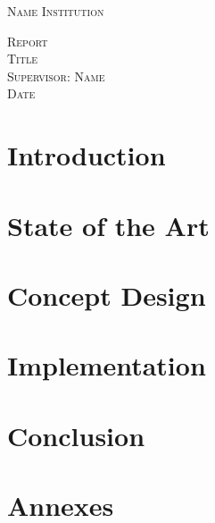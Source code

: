 \documentclass[a4paper, 11pt]{article}
\begin{document}
\begin{titlepage}
	\textsc{\Large Name \hfill Institution}\\[0.5cm]
  \begin{center}
    \textsc{\Large Report}\\[2cm]
	\textsc{\Huge Title}\\[1cm]
    \textsc{\Large Supervisor: Name}\\[1.0cm]
    \textsc{\Large Date}\\

\end{center}

\end{titlepage}

\clearpage
\tableofcontents
\clearpage

\section{Introduction}
%
\clearpage

\section{State of the Art}
%
\clearpage

\section{Concept Design}
%

\section{Implementation}
%

\section{Conclusion}
%

\clearpage
\section{Annexes}
\end{document}
